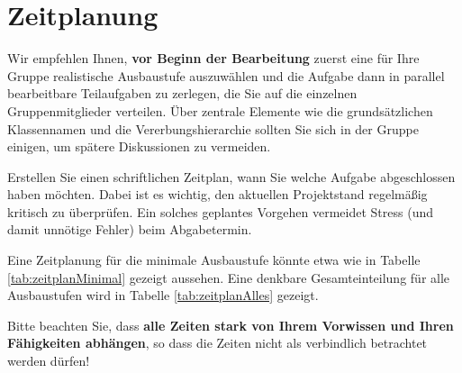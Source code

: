 \section{Zeitplanung}
\label{sec:zeitplanung}

Wir empfehlen Ihnen, \textbf {vor Beginn der Bearbeitung} zuerst eine f\"ur Ihre
Gruppe realistische Ausbaustufe auszuw\"ahlen und die Aufgabe dann in parallel
bearbeitbare Teilaufgaben zu zerlegen, die Sie auf die einzelnen Gruppenmitglieder
verteilen. \"Uber zentrale Elemente wie die grunds\"atzlichen Klassennamen und die
Vererbungshierarchie sollten Sie sich in der Gruppe einigen, um sp\"atere Diskussionen zu vermeiden.

Erstellen Sie einen schriftlichen Zeitplan, wann Sie welche Aufgabe abgeschlossen
haben m\"ochten. Dabei ist es wichtig, den aktuellen Projektstand regelm\"a\ss{}ig
kritisch zu \"uberpr\"ufen. Ein solches geplantes Vorgehen vermeidet Stress (und damit unn\"otige Fehler) beim Abgabetermin.

Eine Zeitplanung f\"ur die minimale Ausbaustufe k\"onnte etwa wie in Tabelle
\vref{tab:zeitplanMinimal} gezeigt aussehen. Eine denkbare Gesamteinteilung f\"ur
alle Ausbaustufen wird in Tabelle \vref{tab:zeitplanAlles} gezeigt.

Bitte beachten Sie, dass \textbf{alle Zeiten stark von Ihrem Vorwissen und Ihren
F\"ahigkeiten abh\"angen}, so dass die Zeiten nicht als \glqq{}verbindlich\grqq{} betrachtet werden d\"urfen!

